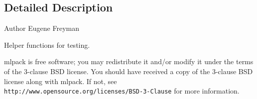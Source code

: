 \subsection{Detailed Description}
\begin{DoxyAuthor}{Author}
Eugene Freyman
\end{DoxyAuthor}
Helper functions for testing.

mlpack is free software; you may redistribute it and/or modify it under the terms of the 3-\/clause B\+SD license. You should have received a copy of the 3-\/clause B\+SD license along with mlpack. If not, see {\tt http\+://www.\+opensource.\+org/licenses/\+B\+S\+D-\/3-\/\+Clause} for more information. 